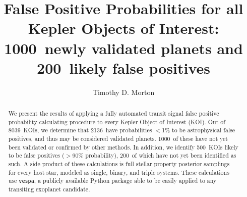 \documentclass{emulateapj}
\newcommand{\ncalc}{8039}
\newcommand{\nvalnew}{1000}
\newcommand{\nfp}{500}
\newcommand{\nfpnew}{200}
\newcommand{\nval}{2136}
\newcommand{\vespa}{\texttt{vespa}}
\begin{document}

\title{False Positive Probabilities for all Kepler Objects of Interest: \\
        \nvalnew\ newly validated planets and \nfpnew\ likely false positives}


\author{Timothy D. Morton}



\begin{abstract}
We present the results of applying a fully automated transit signal
false positive probability calculating procedure to every Kepler
Object of Interest (KOI).
Out of \ncalc\ KOIs, we determine that \nval\ have probabilities
$<$1\% to be astrophysical false positives, and thus may be considered
validated planets.  \nvalnew\ of these have not yet been validated or
confirmed by other methods.  In addition, we identify \nfp\ KOIs
likely to be false positives ($>$90\% probability), \nfpnew\ of which
have not yet been identified as such. A side product of these
calculations is full stellar property posterior samplings for every
host star, modeled as single, binary, and triple systems.  These
calculations use \vespa, a publicly available Python package able to
be easily applied to any transiting exoplanet candidate.
\end{abstract}

\end{document}
